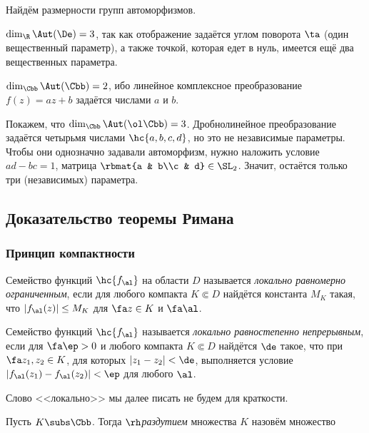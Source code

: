 \documentclass[a4paper]{article}
\begin{document}
Найдём размерности групп автоморфизмов.

\begin{points}{0}
\item $\dim_\R \Aut(\De) = 3$, так как отображение задаётся углом поворота $\ta$ (один вещественный параметр), а также
точкой, которая едет в нуль,  имеется ещё два вещественных параметра.

\item $\dim_\Cbb \Aut(\Cbb) = 2$, ибо линейное комплексное преобразование $f(z)=az+b$ задаётся числами $a$ и $b$.

\item Покажем, что $\dim_\Cbb\Aut(\ol\Cbb)=3$. Дробно\д линейное преобразование задаётся четырьмя числами $\hc{a,b,c,d}$,
но это не независимые параметры. Чтобы они однозначно задавали автоморфизм, нужно наложить условие $ad-bc=1$, 
матрица $\rbmat{a & b\\c & d}\in \SL_2$. Значит, остаётся только три (независимых) параметра.
\end{points}

\subsection{Доказательство теоремы Римана}

\subsubsection{Принцип компактности}

\begin{df}
Семейство функций $\hc{f_\al}$ на области $D$ называется \emph{локально равномерно ограниченным},
если для любого компакта $K \Subset D$ найдётся константа $M_K$ такая, что $|f_\al(z)| \le M_K$
для $\fa z \in K$ и $\fa \al$.
\end{df}

\begin{df}
Семейство функций $\hc{f_\al}$ называется \emph{локально равностепенно непрерывным}, если для $\fa \ep > 0$ и
любого компакта $K \Subset D$ найдётся $\de$ такое, что при $\fa z_1,z_2\in K$, для которых $|z_1 - z_2| <\de$,
выполняется условие $|f_\al(z_1)-f_\al(z_2)|< \ep$ для любого $\al$.
\end{df}

\begin{note}
Слово <<локально>> мы далее писать не будем для краткости.
\end{note}

\begin{df}
Пусть $K \subs \Cbb$. Тогда \emph{$\rh$\д раздутием} множества $K$ назовём множество
\end{df}
\end{document}
